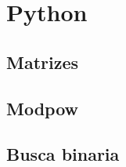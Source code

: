 \section{Python}
\subsection{Matrizes}
\raggedbottom
\hrulefill
\subsection{Modpow}
\raggedbottom
\hrulefill
\subsection{Busca binaria}
\raggedbottom
\hrulefill
\clearpage
